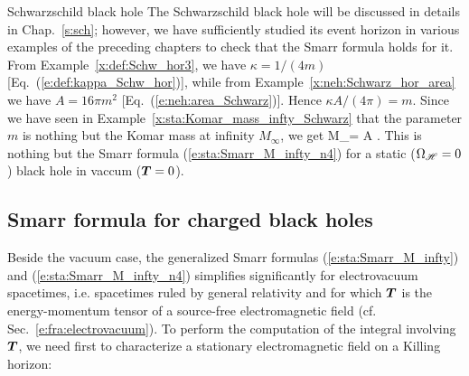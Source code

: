 \begin{texample}{Schwarzschild black hole}{}
The Schwarzschild black hole will be discussed in details in Chap.~\ref{s:sch};
however, we have sufficiently studied its event horizon in various examples
of the preceding chapters to check that the Smarr formula holds
for it. From Example~\ref{x:def:Schw_hor3}, we have
$\kappa = 1/(4 m)$ [Eq.~(\ref{e:def:kappa_Schw_hor})], while from
Example~\ref{x:neh:Schwarz_hor_area}  we have
$A = 16\pi m^2$ [Eq.~(\ref{e:neh:area_Schwarz})]. Hence
$\kappa A / (4\pi) = m$. Since we have seen in Example~\ref{x:sta:Komar_mass_infty_Schwarz}
that the parameter $m$ is nothing but the Komar mass
at infinity $M_\infty$, we get
\be
    M_\infty = \frac{\kappa}{4\pi} A .
\ee
This is nothing but the Smarr formula (\ref{e:sta:Smarr_M_infty_n4})
for a static ($\Omega_{\mathscr{H}} = 0$) black hole in vaccum ($\bm{T}=0$).
\end{texample}

\subsection{Smarr formula for charged black holes} \label{s:sta:Smarr_electrovac}

Beside the vacuum case, the generalized Smarr formulas (\ref{e:sta:Smarr_M_infty})
and (\ref{e:sta:Smarr_M_infty_n4}) simplifies significantly for
electrovacuum spacetimes, i.e. spacetimes ruled by general relativity and
for which $\bm{T}$ is the energy-momentum
tensor of a source-free electromagnetic field (cf. Sec.~\ref{e:fra:electrovacuum}).
To perform the computation of the integral involving $\bm{T}$,
we need first to characterize a stationary electromagnetic field on
a Killing horizon:

